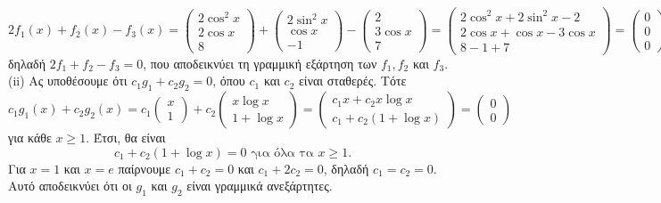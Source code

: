\documentclass[11pt,a4paper,twoside]{book}
\begin{document}
\[
2f_1(x)+f_2(x)-f_3(x) = 
\begin{pmatrix}
2\cos^2 x \\
2\cos x \\
8
\end{pmatrix}
+
\begin{pmatrix}
2\sin^2 x \\
\cos x \\
-1
\end{pmatrix}
-
\begin{pmatrix}
2 \\
3\cos x \\
7
\end{pmatrix}
=
\begin{pmatrix}
2\cos^2 x + 2\sin^2 x - 2 \\
2\cos x + \cos x - 3\cos x \\
8-1+7
\end{pmatrix}
=
\begin{pmatrix}
0 \\
0 \\
0
\end{pmatrix}
,
\]
δηλαδή $2f_1+f_2-f_3=0$, που αποδεικνύει τη γραμμική εξάρτηση των $f_1, f_2$ και $f_3$. (ii) Ας υποθέσουμε ότι $c_1g_1+c_2g_2=0$, όπου $c_1$ και $c_2$ είναι σταθερές. Τότε
\[
c_1g_1(x)+c_2g_2(x) = c_1
\begin{pmatrix}
x \\
1
\end{pmatrix}
+ c_2
\begin{pmatrix}
x \log x \\
1+\log x
\end{pmatrix}
=
\begin{pmatrix}
c_1x+c_2x\log x \\
c_1+c_2(1+\log x)
\end{pmatrix}
=
\begin{pmatrix}
0 \\
0
\end{pmatrix}
\]
για κάθε $x \geq 1$. Έτσι, θα είναι
\[
c_1+c_2(1+\log x)=0 \text{ για όλα τα } x \geq 1.
\]
Για $x=1$ και $x=e$ παίρνουμε $c_1+c_2=0$ και $c_1+2c_2=0$, δηλαδή $c_1=c_2=0$. Αυτό αποδεικνύει ότι οι $g_1$ και $g_2$ είναι γραμμικά ανεξάρτητες.
\end{document}
